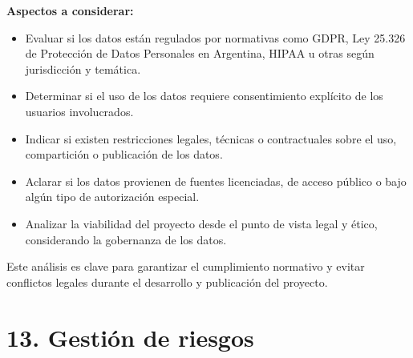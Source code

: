 \documentclass[
11pt, %
]{ProyectoVpC}
\begin{document}
\textbf{Aspectos a considerar:}
\begin{itemize}
  \item Evaluar si los datos están regulados por normativas como GDPR, Ley 25.326 de Protección de Datos Personales en Argentina, HIPAA u otras según jurisdicción y temática.
  \item Determinar si el uso de los datos requiere consentimiento explícito de los usuarios involucrados.
  \item Indicar si existen restricciones legales, técnicas o contractuales sobre el uso, compartición o publicación de los datos.
  \item Aclarar si los datos provienen de fuentes licenciadas, de acceso público o bajo algún tipo de autorización especial.
  \item Analizar la viabilidad del proyecto desde el punto de vista legal y ético, considerando la gobernanza de los datos.
\end{itemize}

Este análisis es clave para garantizar el cumplimiento normativo y evitar conflictos legales durante el desarrollo y publicación del proyecto.


\section{13. Gestión de riesgos}
\label{sec:riesgos}
\end{document}
